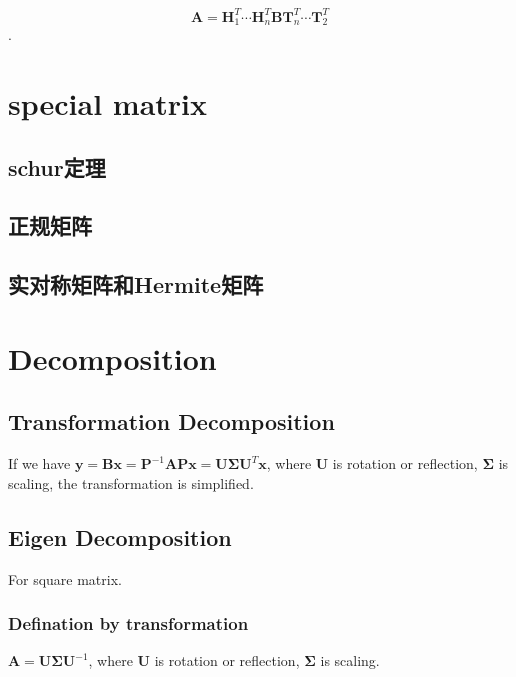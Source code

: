 \documentclass[UTF8]{../../09-Mathematics}
\begin{document}
$$
\boldsymbol A= \boldsymbol H_{1}^T \cdots \boldsymbol H_{n}^T  \boldsymbol B 
\boldsymbol T_{n}^T \cdots \boldsymbol T_{2}^T
$$.



\chapter{special matrix}
\section{schur定理}

\section{正规矩阵}

\section{实对称矩阵和Hermite矩阵}




\chapter{Decomposition}

\section{Transformation Decomposition}

If we have 
$\boldsymbol y = \boldsymbol B \boldsymbol x= \boldsymbol P^{-1} \boldsymbol A \boldsymbol P \boldsymbol x = \boldsymbol U \boldsymbol \Sigma  \boldsymbol U^T \boldsymbol x$, where $ \boldsymbol U $ is rotation or reflection, $ \boldsymbol \Sigma  $ is scaling, the transformation is simplified.





\section{Eigen Decomposition}

For square matrix.
 
\subsection{Defination by transformation}
  $\boldsymbol A =\boldsymbol U \boldsymbol \Sigma  \boldsymbol U^{-1} $, where $ \boldsymbol U $ is rotation or reflection, $ \boldsymbol \Sigma  $ is scaling.
 
\end{document}
